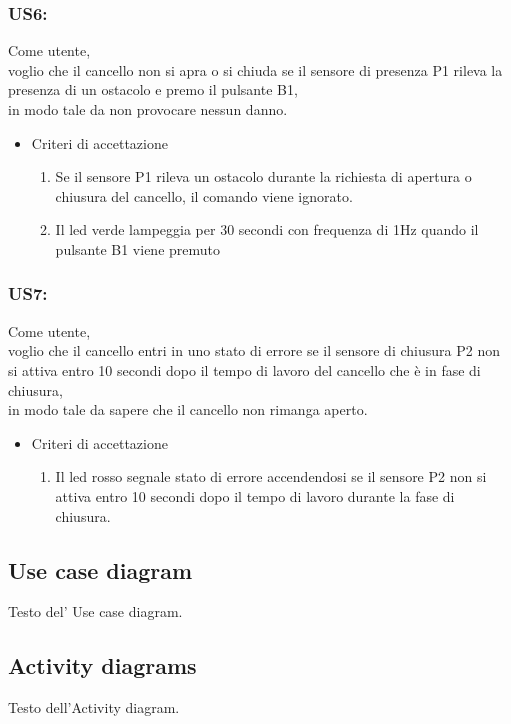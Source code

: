 \documentclass[12pt]{article}
\begin{document}
\subsubsection{US6:}
Come utente, \\
voglio che il cancello non si apra o si chiuda se il sensore di presenza P1 rileva la presenza di un ostacolo e premo il pulsante B1,\\
in modo tale da non provocare nessun danno.
\begin{itemize}
    \item Criteri di accettazione
    \begin{enumerate}
        \item Se il sensore P1 rileva un ostacolo durante la richiesta di apertura o chiusura del cancello, il comando viene ignorato.
        \item Il led verde lampeggia per 30 secondi con frequenza di 1Hz quando il pulsante B1 viene premuto
   \end{enumerate}
\end{itemize}
\subsubsection{US7:}
Come utente, \\
voglio che il cancello entri in uno stato di errore se il sensore di chiusura P2 non si attiva entro 10 secondi dopo il tempo di lavoro del cancello che è in fase di chiusura,\\
in modo tale da sapere che il cancello non rimanga aperto.
\begin{itemize}
    \item Criteri di accettazione
    \begin{enumerate}
        \item Il led rosso segnale stato di errore accendendosi se il sensore P2 non si attiva entro 10 secondi dopo il tempo di lavoro durante la fase di chiusura.
    \end{enumerate}
\end{itemize}
\newpage



\subsection{Use case diagram}
Testo del' Use case diagram.

\subsection{Activity diagrams}
Testo dell'Activity diagram.
\end{document}
